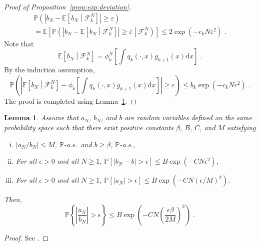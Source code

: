 \documentclass[12pt]{article}
\newcommand{\rmd}{\mathrm{d}}
\newcommand{\eqsp}{\;}
\newcommand{\1}{\mathrm{1}}
\newtheorem{lemma}{Lemma}
\begin{document}
\begin{proof}[Proof of Proposition~\ref{prop:exp:deviation}]
\begin{multline*}
\mathbb{P}\left(\left|b_N - \mathbb{E}\left[b_N\middle|\mathcal{F}_k^{N}\right]\right|\ge \varepsilon\right) \\
= \mathbb{E}\left[\mathbb{P}\left(\left|b_N - \mathbb{E}\left[b_N\middle|\mathcal{F}_k^{N}\right]\right|\ge \varepsilon\middle|\mathcal{F}_k^{N}\right)\right]\le 2\exp\left(-c_kN\varepsilon^2\right)\eqsp.
\end{multline*}
Note that
\[
\mathbb{E}\left[b_N\middle|\mathcal{F}_k^{N}\right] = \phi^N_{k}\left[\int q_{k}(\cdot,x)g_{k+1}(x)\rmd x\right]\eqsp.
\]
By  the induction assumption,
\[
\mathbb{P}\left(\left|\mathbb{E}\left[b_N\middle|\mathcal{F}_k^{N}\right]-\phi_k\left[\int q_{k}(\cdot,x)g_{k+1}(x)\rmd x\right]\right|\ge \varepsilon\right)\le b_k\exp\left(-c_kN\varepsilon^2\right)\eqsp.
\]
The proof is completed using Lemma~\ref{lem:hoeffding:ratio}.
\end{proof}


\begin{lemma}\label{lem:hoeffding:ratio}
Assume that $a_N$, $b_N$, and $b$ are random variables defined on the same probability space such that there exist positive constants $\beta$, $B$, $C$, and $M$ satisfying
\begin{enumerate}[(i)]
    \item $|a_N/b_N|\leq M$, $\mathbb{P}$-a.s.\ and  $b \geq \beta$, $\mathbb{P}$-a.s.,
    \item For all $\epsilon>0$ and all $N\geq1$, $\mathbb{P}\left[|b_N-b|>\epsilon \right]\leq B \exp\left(-C N \epsilon^2\right)$,
    \item For all $\epsilon>0$ and all $N\geq1$, $\mathbb{P} \left[ |a_N|>\epsilon \right]\leq B \exp\left(-C N \left(\epsilon/M\right)^2\right)$.
\end{enumerate}
Then,
$$
    \mathbb{P}\left\{ \left| \frac{a_N}{b_N} \right| > \epsilon \right\} \leq B \exp{\left(-C N \left(\frac{\epsilon \beta}{2M} \right)^2 \right)} \eqsp.
$$
\end{lemma}
\begin{proof}
See \cite{douc:garivier:moulines:olsson:2011}.
\end{proof}





\end{document}
